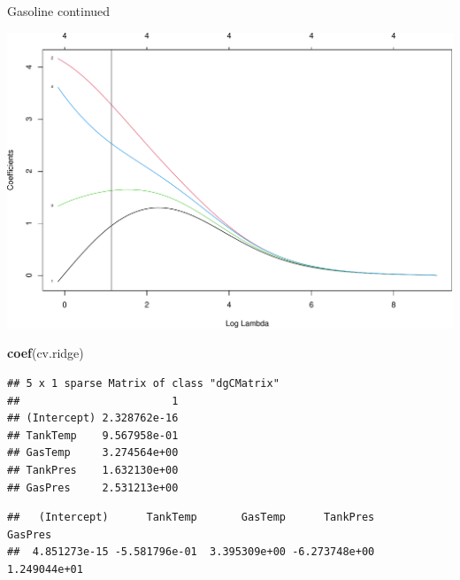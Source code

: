 \documentclass[
  ignorenonframetext,
]{beamer}
\newenvironment{Shaded}{\begin{snugshade}}{\end{snugshade}}
\newcommand{\CommentTok}[1]{\textcolor[rgb]{0.56,0.35,0.01}{\textit{#1}}}
\newcommand{\DataTypeTok}[1]{\textcolor[rgb]{0.13,0.29,0.53}{#1}}
\newcommand{\FloatTok}[1]{\textcolor[rgb]{0.00,0.00,0.81}{#1}}
\newcommand{\KeywordTok}[1]{\textcolor[rgb]{0.13,0.29,0.53}{\textbf{#1}}}
\newcommand{\NormalTok}[1]{#1}
\newcommand{\OperatorTok}[1]{\textcolor[rgb]{0.81,0.36,0.00}{\textbf{#1}}}
\newcommand{\OtherTok}[1]{\textcolor[rgb]{0.56,0.35,0.01}{#1}}
\newcommand{\StringTok}[1]{\textcolor[rgb]{0.31,0.60,0.02}{#1}}
\begin{document}
\begin{frame}[fragile]
\begin{block}{Gasoline continued}
\begin{Shaded}
\end{Shaded}

\includegraphics{L2_files/figure-beamer/unnamed-chunk-10-2.pdf}

\begin{Shaded}
\begin{Highlighting}[]
\KeywordTok{coef}\NormalTok{(cv.ridge)}
\end{Highlighting}
\end{Shaded}

\begin{verbatim}
## 5 x 1 sparse Matrix of class "dgCMatrix"
##                        1
## (Intercept) 2.328762e-16
## TankTemp    9.567958e-01
## GasTemp     3.274564e+00
## TankPres    1.632130e+00
## GasPres     2.531213e+00
\end{verbatim}

\begin{Shaded}
\end{Shaded}

\begin{verbatim}
##   (Intercept)      TankTemp       GasTemp      TankPres       GasPres 
##  4.851273e-15 -5.581796e-01  3.395309e+00 -6.273748e+00  1.249044e+01
\end{verbatim}


\end{block}
\end{frame}
\end{document}
